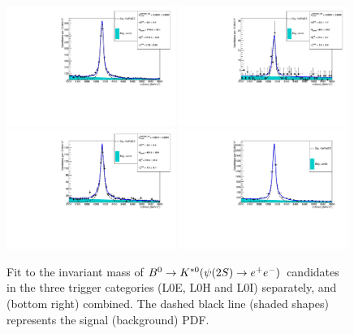 %
\begin{figure}[h!]
\centering
\includegraphics[width=0.49\textwidth]{RKst/figs/Fit/fit_EE/KstPsiEE_L0E.pdf}
\includegraphics[width=0.49\textwidth]{RKst/figs/Fit/fit_EE/KstPsiEE_L0H.pdf}
\includegraphics[width=0.49\textwidth]{RKst/figs/Fit/fit_EE/KstPsiEE_L0I.pdf}
\includegraphics[width=0.49\textwidth]{RKst/figs/Fit/fit_EE/fit_Psi.pdf}
\caption{Fit to the \mKpiee invariant mass of $\Bd\to\Kstarz(\psitwos\to\ee)$ candidates in the three trigger categories (L0E, L0H and L0I) separately, and (bottom right) combined. The dashed black line (shaded shapes) represents the signal (background) PDF.}
\label{fig:fitPsiEE}
\end{figure}
